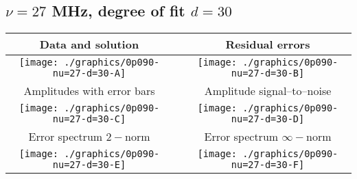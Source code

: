 

% 

\clearpage{}
\break{}

\subsection{$\nu = 27$ MHz, degree of fit $d = 30$}

\begin{table}[h]
    \begin{center}
        \begin{tabular}{ccc}
            Data and solution & \quad & Residual errors \\\hline
            \texttt{[image: ./graphics/0p090-nu=27-d=30-A]} &&
            \texttt{[image: ./graphics/0p090-nu=27-d=30-B]} \\[15pt]
            Amplitudes with error bars && Amplitude signal--to--noise \\\hline
            \texttt{[image: ./graphics/0p090-nu=27-d=30-C]} &&
            \texttt{[image: ./graphics/0p090-nu=27-d=30-D]} \\[15pt]
            Error spectrum $2-$norm && Error spectrum $\infty-$norm \\\hline
            \texttt{[image: ./graphics/0p090-nu=27-d=30-E]} &&
            \texttt{[image: ./graphics/0p090-nu=27-d=30-F]} \\[15pt]
        \end{tabular}
    \end{center}
\label{fig:elev=90, nu=27}
\end{table}



\endinput
